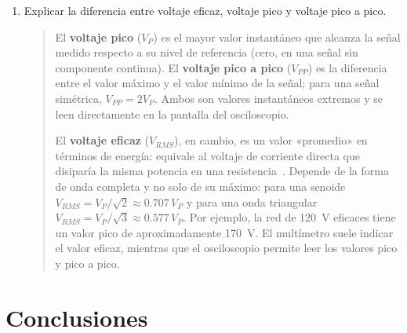 \documentclass{article}
\begin{document}
\begin{enumerate}
        \item Explicar la diferencia entre voltaje eficaz, voltaje pico y voltaje pico a pico.

        \begin{quote}
            El \textbf{voltaje pico} ($V_P$) es el mayor valor instantáneo que alcanza la señal medido respecto a su nivel de referencia (cero, en una señal sin componente continua). El \textbf{voltaje pico a pico} ($V_{PP}$) es la diferencia entre el valor máximo y el valor mínimo de la señal; para una señal simétrica, $V_{PP} = 2V_P$. Ambos son valores instantáneos extremos y se leen directamente en la pantalla del osciloscopio.

            El \textbf{voltaje eficaz} ($V_{RMS}$), en cambio, es un valor «promedio» en términos de energía: equivale al voltaje de corriente directa que disiparía la misma potencia en una resistencia~\cite{alexander2018fundamentos}. Depende de la forma de onda completa y no solo de su máximo: para una senoide $V_{RMS} = V_P/\sqrt{2} \approx 0.707\,V_P$ y para una onda triangular $V_{RMS} = V_P/\sqrt{3} \approx 0.577\,V_P$. Por ejemplo, la red de \SI{120}{\volt} eficaces tiene un valor pico de aproximadamente \SI{170}{\volt}. El multímetro suele indicar el valor eficaz, mientras que el osciloscopio permite leer los valores pico y pico a pico.
        \end{quote}
    \end{enumerate}

    \section{Conclusiones}
\end{document}
